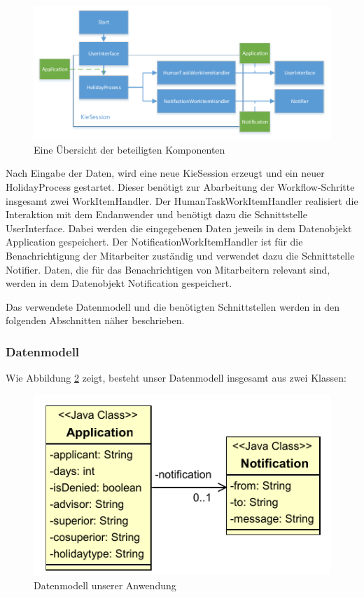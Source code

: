 \begin{figure}[H]
\centering
\includegraphics[width=0.93\linewidth]{Bilder/Komponenten}
\caption{Eine Übersicht der beteiligten Komponenten}
\label{fig:Komponenten}
\end{figure}

Nach Eingabe der Daten, wird eine neue KieSession erzeugt und ein neuer HolidayProcess gestartet. Dieser benötigt zur Abarbeitung der Workflow-Schritte insgesamt zwei WorkItemHandler. Der HumanTaskWorkItemHandler realisiert die Interaktion mit dem Endanwender und benötigt dazu die Schnittstelle UserInterface. Dabei werden die eingegebenen Daten jeweils in dem Datenobjekt Application gespeichert. Der NotificationWorkItemHandler ist für die Benachrichtigung der Mitarbeiter zuständig und verwendet dazu die Schnittstelle Notifier. Daten, die für das Benachrichtigen von Mitarbeitern relevant sind, werden in dem Datenobjekt Notification gespeichert.

Das verwendete Datenmodell und die benötigten Schnittstellen werden in den folgenden Abschnitten näher beschrieben.

\subsubsection{Datenmodell}
Wie Abbildung \ref{fig:Datenmodell} zeigt, besteht unser Datenmodell insgesamt aus zwei Klassen:

\begin{figure}[H]
\centering
\includegraphics[width=0.5\linewidth]{Bilder/Datenmodell}
\caption{Datenmodell unserer Anwendung}
\label{fig:Datenmodell}
\end{figure}

